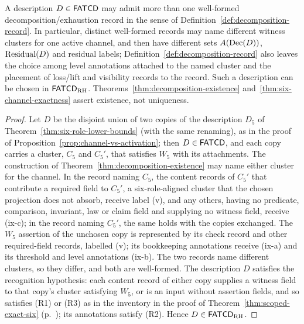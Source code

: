 \begin{proposition}\label{prop:non-uniqueness}
A description \(D \in \mathsf{FATCD}{}\) may admit more than one well-formed
decomposition/exhaustion record in the sense of
Definition~\ref{def:decomposition-record}. In particular, distinct
well-formed records may name different witness clusters for one active
channel, and then have different sets \(A(\operatorname{Dec}\!\left(D\right))\), \(\operatorname{Residual}\!\left(D\right)\) and
residual labels; Definition~\ref{def:decomposition-record} also leaves the choice among
level annotations attached to the named cluster and the placement of
loss/lift and visibility records to the record. Such a description can be chosen in \(\mathsf{FATCD}_{\mathrm{RH}}\).
Theorems~\ref{thm:decomposition-existence}
and~\ref{thm:six-channel-exactness} assert existence, not uniqueness.
\end{proposition}

\begin{proof}
Let \(D\) be the disjoint union of two copies of the description \(D_5\) of
Theorem~\ref{thm:six-role-lower-bounds} (with the same renaming), as in the proof of
Proposition~\ref{prop:channel-vs-activation}; then \(D\in\mathsf{FATCD}{}\), and each
copy carries a cluster, \(C_5\) and \(C_5'\), that satisfies \(W_5\) with its
attachments. The construction of Theorem~\ref{thm:decomposition-existence}
may name either cluster for the \Pfive{} channel. In the record naming
\(C_5\), the content records of \(C_5'\) that contribute a required field to
\(C_5'\), a six-role-aligned cluster that the chosen projection does not
absorb, receive label (v), and any others, having no predicate, comparison,
invariant, law or claim field and supplying no witness field, receive (ix-c); in the record naming \(C_5'\), the same holds with the
copies exchanged. The \(W_5\) assertion of the unchosen copy is represented by
its check record and other required-field records, labelled (v); its
bookkeeping annotations receive (ix-a) and its threshold and level annotations
(ix-b).
The two records name different clusters, so they differ, and both are
well-formed. The description \(D\) satisfies the recognition hypothesis: each
content record of either copy supplies a witness field to that copy's cluster
satisfying \(W_5\), or is an input without assertion fields, and so satisfies
(R1) or (R3) as in the inventory in the proof of
Theorem~\ref{thm:scoped-exact-six} (p.~\pageref{thm:scoped-exact-six}); its annotations satisfy (R2). Hence
\(D\in\mathsf{FATCD}_{\mathrm{RH}}\).
\end{proof}

